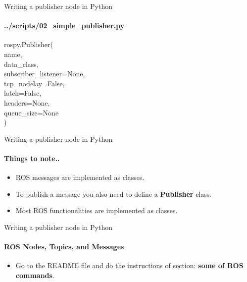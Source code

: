 \documentclass{beamer}
\begin{document}
\begin{frame}[fragile]{Writing a publisher node in Python}
    \framesubtitle{../scripts/02\_simple\_publisher.py}
    \begin{focus}
        
        \ttfamily rospy.Publisher(\\
                                 {\color{red}name},\\
                                 {\color{red}data\_class},\\
                                 {\color{blue}subscriber\_listener=None}, \\
                                 {\color{blue}tcp\_nodelay=False},\\
                                 {\color{blue}latch=False},\\
                                 {\color{blue}headers=None},\\
                                 {\color{red}queue\_size=None}\\)
    \end{focus}

\end{frame}


\begin{frame}[fragile]{Writing a publisher node in Python}
    \framesubtitle{Things to note..}
    
    \begin{itemize}
        \item  ROS messages are implemented as classes.
        \item  To publish a message you also need to define a \textbf{Publisher} class.
        \item Most ROS functionalities are implemented as classes.
    \end{itemize}   
\end{frame}


\begin{frame}[fragile]{Writing a publisher node in Python}
    \framesubtitle{ROS Nodes, Topics, and Messages}
    
    \begin{itemize}
        \centering
        \item  Go to the README file and do the instructions of section: \textbf{some of ROS commands}.
    \end{itemize}   
\end{frame}
\end{document}
